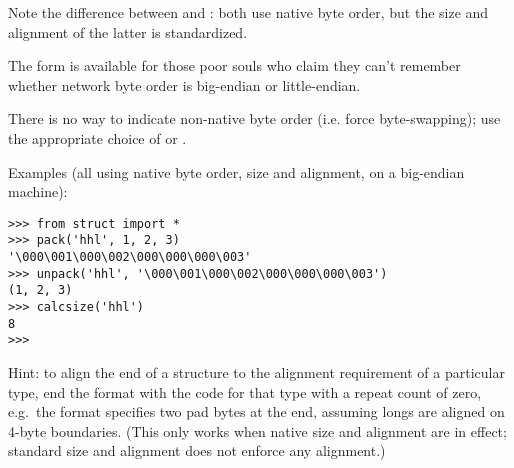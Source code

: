 Note the difference between  and : both use native
byte order, but the size and alignment of the latter is standardized.

The form  is available for those poor souls who claim they
can't remember whether network byte order is big-endian or
little-endian.

There is no way to indicate non-native byte order (i.e. force
byte-swapping); use the appropriate choice of  or
.

Examples (all using native byte order, size and alignment, on a
big-endian machine):

\bcode\begin{verbatim}
>>> from struct import *
>>> pack('hhl', 1, 2, 3)
'\000\001\000\002\000\000\000\003'
>>> unpack('hhl', '\000\001\000\002\000\000\000\003')
(1, 2, 3)
>>> calcsize('hhl')
8
>>> 
\end{verbatim}\ecode
%
Hint: to align the end of a structure to the alignment requirement of
a particular type, end the format with the code for that type with a
repeat count of zero, e.g.\ the format  specifies two
pad bytes at the end, assuming longs are aligned on 4-byte boundaries.
(This only works when native size and alignment are in effect;
standard size and alignment does not enforce any alignment.)
